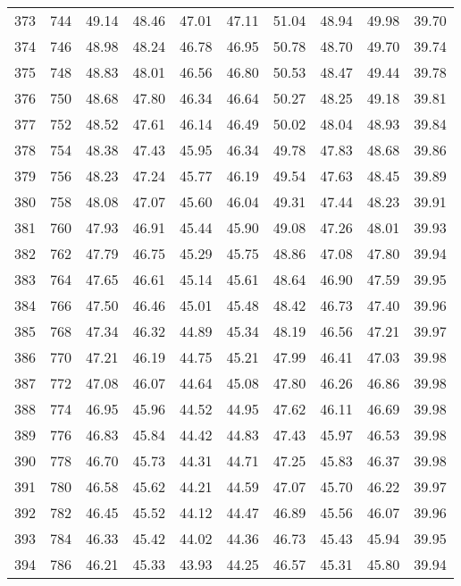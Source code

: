 \begin{longtable}{rrllllllll}
		373 & 744 & 49.14 & 48.46 & 47.01 & 47.11 & 51.04 & 48.94 & 49.98 & 39.70 \\ 
		374 & 746 & 48.98 & 48.24 & 46.78 & 46.95 & 50.78 & 48.70 & 49.70 & 39.74 \\ 
		375 & 748 & 48.83 & 48.01 & 46.56 & 46.80 & 50.53 & 48.47 & 49.44 & 39.78 \\ 
		376 & 750 & 48.68 & 47.80 & 46.34 & 46.64 & 50.27 & 48.25 & 49.18 & 39.81 \\ 
		377 & 752 & 48.52 & 47.61 & 46.14 & 46.49 & 50.02 & 48.04 & 48.93 & 39.84 \\ 
		378 & 754 & 48.38 & 47.43 & 45.95 & 46.34 & 49.78 & 47.83 & 48.68 & 39.86 \\ 
		379 & 756 & 48.23 & 47.24 & 45.77 & 46.19 & 49.54 & 47.63 & 48.45 & 39.89 \\ 
		380 & 758 & 48.08 & 47.07 & 45.60 & 46.04 & 49.31 & 47.44 & 48.23 & 39.91 \\ 
		381 & 760 & 47.93 & 46.91 & 45.44 & 45.90 & 49.08 & 47.26 & 48.01 & 39.93 \\ 
		382 & 762 & 47.79 & 46.75 & 45.29 & 45.75 & 48.86 & 47.08 & 47.80 & 39.94 \\ 
		383 & 764 & 47.65 & 46.61 & 45.14 & 45.61 & 48.64 & 46.90 & 47.59 & 39.95 \\ 
		384 & 766 & 47.50 & 46.46 & 45.01 & 45.48 & 48.42 & 46.73 & 47.40 & 39.96 \\ 
		385 & 768 & 47.34 & 46.32 & 44.89 & 45.34 & 48.19 & 46.56 & 47.21 & 39.97 \\ 
		386 & 770 & 47.21 & 46.19 & 44.75 & 45.21 & 47.99 & 46.41 & 47.03 & 39.98 \\ 
		387 & 772 & 47.08 & 46.07 & 44.64 & 45.08 & 47.80 & 46.26 & 46.86 & 39.98 \\ 
		388 & 774 & 46.95 & 45.96 & 44.52 & 44.95 & 47.62 & 46.11 & 46.69 & 39.98 \\ 
		389 & 776 & 46.83 & 45.84 & 44.42 & 44.83 & 47.43 & 45.97 & 46.53 & 39.98 \\ 
		390 & 778 & 46.70 & 45.73 & 44.31 & 44.71 & 47.25 & 45.83 & 46.37 & 39.98 \\ 
		391 & 780 & 46.58 & 45.62 & 44.21 & 44.59 & 47.07 & 45.70 & 46.22 & 39.97 \\ 
		392 & 782 & 46.45 & 45.52 & 44.12 & 44.47 & 46.89 & 45.56 & 46.07 & 39.96 \\ 
		393 & 784 & 46.33 & 45.42 & 44.02 & 44.36 & 46.73 & 45.43 & 45.94 & 39.95 \\ 
		394 & 786 & 46.21 & 45.33 & 43.93 & 44.25 & 46.57 & 45.31 & 45.80 & 39.94 \\ 

\end{longtable}
